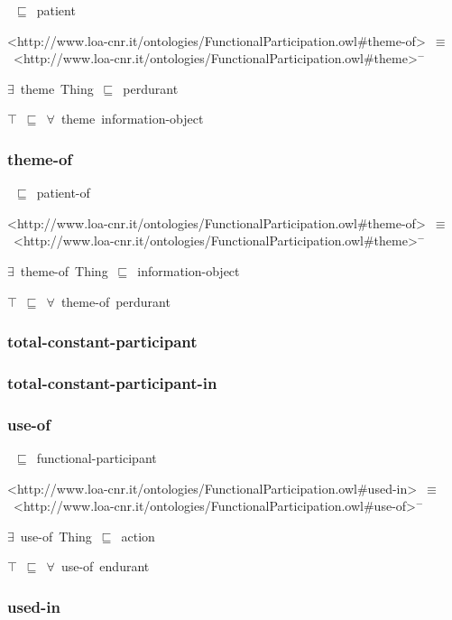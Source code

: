 \documentclass{article}
\begin{document}
~\ensuremath{\sqsubseteq}~patient

<http://www.loa-cnr.it/ontologies/FunctionalParticipation.owl#theme-of>~\ensuremath{\equiv}~<http://www.loa-cnr.it/ontologies/FunctionalParticipation.owl#theme>\ensuremath{^-}

\ensuremath{\exists}~theme~Thing~\ensuremath{\sqsubseteq}~perdurant

\ensuremath{\top}~\ensuremath{\sqsubseteq}~\ensuremath{\forall}~theme~information-object

\subsubsection*{theme-of}

~\ensuremath{\sqsubseteq}~patient-of

<http://www.loa-cnr.it/ontologies/FunctionalParticipation.owl#theme-of>~\ensuremath{\equiv}~<http://www.loa-cnr.it/ontologies/FunctionalParticipation.owl#theme>\ensuremath{^-}

\ensuremath{\exists}~theme-of~Thing~\ensuremath{\sqsubseteq}~information-object

\ensuremath{\top}~\ensuremath{\sqsubseteq}~\ensuremath{\forall}~theme-of~perdurant

\subsubsection*{total-constant-participant}

\subsubsection*{total-constant-participant-in}

\subsubsection*{use-of}

~\ensuremath{\sqsubseteq}~functional-participant

<http://www.loa-cnr.it/ontologies/FunctionalParticipation.owl#used-in>~\ensuremath{\equiv}~<http://www.loa-cnr.it/ontologies/FunctionalParticipation.owl#use-of>\ensuremath{^-}

\ensuremath{\exists}~use-of~Thing~\ensuremath{\sqsubseteq}~action

\ensuremath{\top}~\ensuremath{\sqsubseteq}~\ensuremath{\forall}~use-of~endurant

\subsubsection*{used-in}
\end{document}
